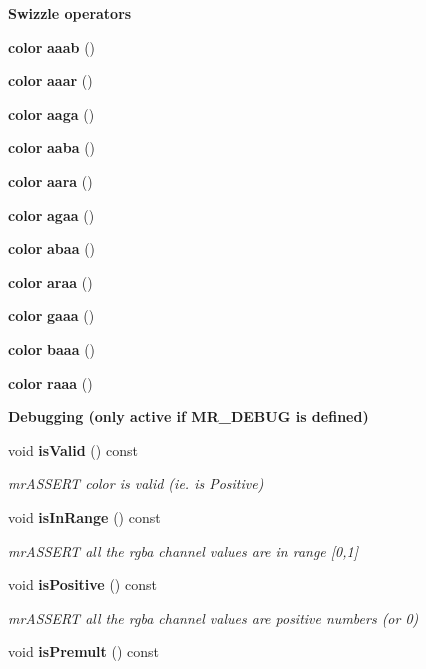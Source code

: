 \begin{Indent}{\bf Swizzle operators}
\begin{CompactItemize}
{\bf color} {\bf aaab} ()
\item 
{\bf color} {\bf aaar} ()
\item 
{\bf color} {\bf aaga} ()
\item 
{\bf color} {\bf aaba} ()
\item 
{\bf color} {\bf aara} ()
\item 
{\bf color} {\bf agaa} ()
\item 
{\bf color} {\bf abaa} ()
\item 
{\bf color} {\bf araa} ()
\item 
{\bf color} {\bf gaaa} ()
\item 
{\bf color} {\bf baaa} ()
\item 
{\bf color} {\bf raaa} ()
\end{CompactItemize}
\end{Indent}
\begin{Indent}{\bf Debugging (only active if MR\_\-DEBUG is defined)}\par
\begin{CompactItemize}
\item 
void {\bf is\-Valid} () const 
\begin{CompactList}\small\item\em mr\-ASSERT color is valid (ie. is Positive) \item\end{CompactList}\item 
void {\bf is\-In\-Range} () const 
\begin{CompactList}\small\item\em mr\-ASSERT all the rgba channel values are in range [0,1] \item\end{CompactList}\item 
void {\bf is\-Positive} () const 
\begin{CompactList}\small\item\em mr\-ASSERT all the rgba channel values are positive numbers (or 0) \item\end{CompactList}\item 
void {\bf is\-Premult} () const 
\end{CompactItemize}
\end{Indent}
